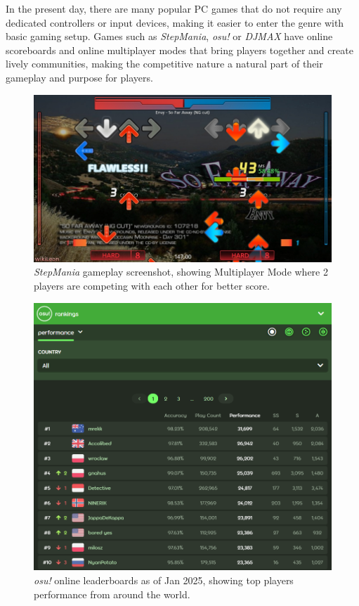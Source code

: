 In the present day, there are many popular PC games that do not require any dedicated controllers or input devices, making it easier to enter the genre with basic gaming setup. Games such as \textit{StepMania}, \textit{osu!} or \textit{DJMAX} have online scoreboards and online multiplayer modes that bring players together and create lively communities, making the competitive nature a natural part of their gameplay and purpose for players.

\begin{figure}[h]
    \centering\includegraphics[scale=0.4]{obrazki/sm5multi.jpg}
    \caption{\textit{StepMania} gameplay screenshot, showing Multiplayer Mode where 2 players are competing with each other for better score. \cite{sm5multi}}
    \label{fig:sm5_multi}
\end{figure}
\pagebreak
\begin{figure}[h]
    \centering\includegraphics[scale=0.6]{obrazki/osuleaderboards.png}
    \caption{\textit{osu!} online leaderboards as of Jan 2025, showing top players performance from around the world. \cite{osuleaderboards}}
    \label{fig:osu_leaderboards}
\end{figure}
 
